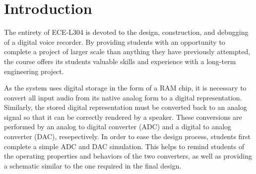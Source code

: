 \section{Introduction}
The entirety of ECE-L304 is devoted to the design, construction, and debugging
of a digital voice recorder.  By providing students with an opportunity to
complete a project of larger scale than anything they have previously
attempted, the course offers its students valuable skills and experience with a
long-term engineering project.

As the system uses digital storage in the form of a RAM chip, it is necessary
to convert all input audio from its native analog form to a digital
representation.  Similarly, the stored digital representation must be converted
back to an analog signal so that it can be correctly rendered by a speaker.
These conversions are performed by an analog to digital converter (ADC) and a
digital to analog converter (DAC), resepectively.
%
In order to ease the design process, students first complete a simple ADC and
DAC simulation.  This helps to remind students of the operating properties and
behaviors of the two converters, as well as providing a schematic similar to
the one required in the final design.
